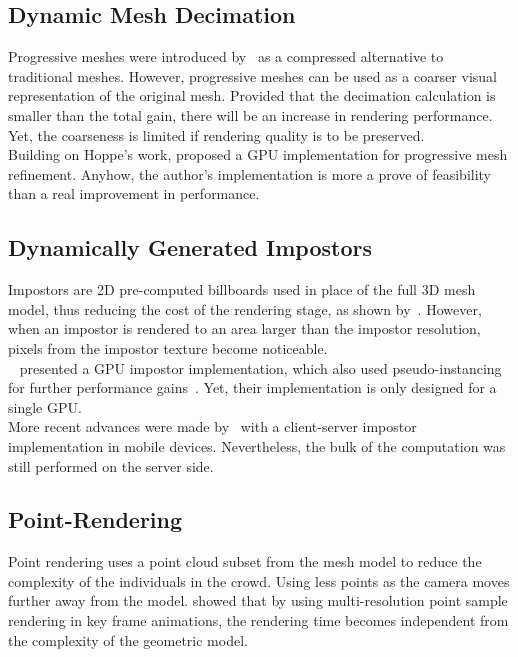 \documentclass[6pt]{article} %
\begin{document}
\begin{multicols}{2}
\subsection{Dynamic Mesh Decimation}

Progressive meshes were introduced by~\cite{Hoppe1996} as a compressed alternative to traditional meshes.
However, progressive meshes can be used as a coarser visual representation of the original mesh.
Provided that the decimation calculation is smaller than the total gain, there will be an increase in rendering performance.
Yet, the coarseness is limited if rendering quality is to be preserved.\\

Building on Hoppe's work, \cite{Hu2009} proposed a GPU implementation for progressive mesh refinement.
Anyhow, the author's implementation is more a prove of feasibility than a real improvement in performance.

\subsection{Dynamically Generated Impostors}
\label{subsec:DimGenImpostors}

Impostors are 2D pre-computed billboards used in place of the full 3D mesh model, thus reducing the cost of the rendering stage, as shown by~\cite{Aubel2000}.
However, when an impostor is rendered to an area larger than the impostor resolution, pixels from the impostor texture become noticeable.\\

~\cite{Millan2006} presented a GPU impostor implementation, which also used pseudo-instancing for further performance gains~\cite{zelsnack2004glsl}.
Yet, their implementation is only designed for a single GPU.\\

More recent advances were made by~\cite{Ghiletiuc2013} with a client-server impostor implementation in mobile devices.
Nevertheless, the bulk of the computation was still performed on the server side.

\subsection{Point-Rendering}

Point rendering uses a point cloud subset from the mesh model to reduce the complexity of the individuals in the crowd.
Using less points as the camera moves further away from the model.
\cite{Wand2002} showed that by using multi-resolution point sample rendering in key frame animations, the rendering time becomes independent from the complexity of the geometric model.\\


\end{multicols}
\end{document}

